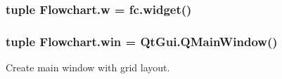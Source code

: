 \subsubsection[{w}]{\setlength{\rightskip}{0pt plus 5cm}tuple Flowchart.\+w = fc.\+widget()}\label{namespaceFlowchart_adb242633cef63f930a6b70acdbbfec00}
\hypertarget{namespaceFlowchart_a0b07efb30fc1f11db38e4e6242d25f89}{}
\subsubsection[{win}]{\setlength{\rightskip}{0pt plus 5cm}tuple Flowchart.\+win = Qt\+Gui.\+Q\+Main\+Window()}\label{namespaceFlowchart_a0b07efb30fc1f11db38e4e6242d25f89}


Create main window with grid layout. 

